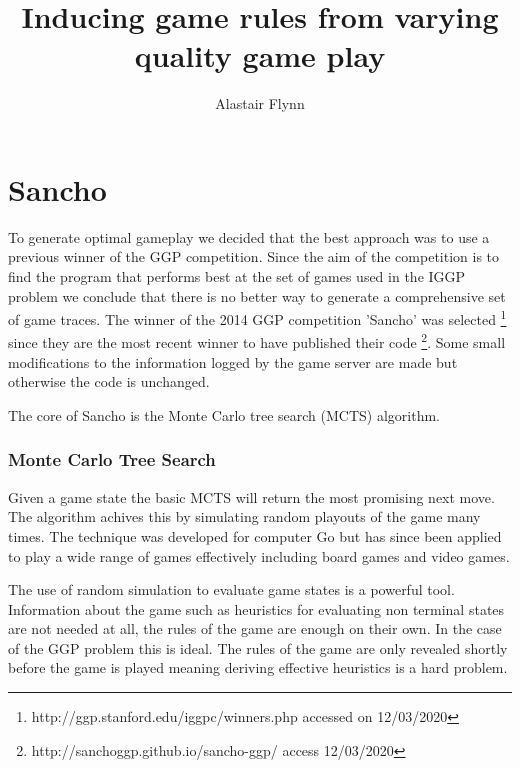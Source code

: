 \documentclass[a4paper,10pt]{report}
\begin{document}
\title{\Large{\textbf{Inducing game rules from varying quality game play}}}
\author{Alastair Flynn}
\maketitle








\section{Sancho}
To generate optimal gameplay we decided that the best approach was to use a previous winner of the GGP competition. Since the aim of the competition is to find the program that performs best at the set of games used in the IGGP problem we conclude that there is no better way to generate a comprehensive set of game traces. The winner of the 2014 GGP competition 'Sancho' was selected \footnote{http://ggp.stanford.edu/iggpc/winners.php accessed on 12/03/2020} since they are the most recent winner to have published their code \footnote{http://sanchoggp.github.io/sancho-ggp/ access 12/03/2020}. Some small modifications to the information logged by the game server are made but otherwise the code is unchanged.

The core of Sancho is the Monte Carlo tree search (MCTS) algorithm.

\subsubsection{Monte Carlo Tree Search}
Given a game state the basic MCTS will return the most promising next move. The algorithm achives this by simulating random playouts of the game many times. The technique was developed for computer Go but has since been applied to play a wide range of games effectively including board games and video games\cite{Silver/MCTS}\cite{Chaslot/MCTS}.

The use of random simulation to evaluate game states is a powerful tool. Information about the game such as heuristics for evaluating non terminal states are not needed at all, the rules of the game are enough on their own. In the case of the GGP problem this is ideal. The rules of the game are only revealed shortly before the game is played meaning deriving effective heuristics is a hard problem.
\end{document}
